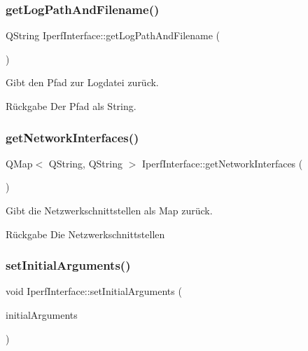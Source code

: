 \subsubsection{\texorpdfstring{get\+Log\+Path\+And\+Filename()}{getLogPathAndFilename()}}
{\footnotesize\ttfamily Q\+String Iperf\+Interface\+::get\+Log\+Path\+And\+Filename (\begin{DoxyParamCaption}{ }\end{DoxyParamCaption})}



Gibt den Pfad zur Logdatei zurück. 

\begin{DoxyReturn}{Rückgabe}
Der Pfad als String. 
\end{DoxyReturn}
\hypertarget{class_iperf_interface_a81faf533ca54a96e9fa33006d50830bd}{}\label{class_iperf_interface_a81faf533ca54a96e9fa33006d50830bd} 
\subsubsection{\texorpdfstring{get\+Network\+Interfaces()}{getNetworkInterfaces()}}
{\footnotesize\ttfamily Q\+Map$<$ Q\+String, Q\+String $>$ Iperf\+Interface\+::get\+Network\+Interfaces (\begin{DoxyParamCaption}{ }\end{DoxyParamCaption})}



Gibt die Netzwerkschnittstellen als Map zurück. 

\begin{DoxyReturn}{Rückgabe}
Die Netzwerkschnittstellen 
\end{DoxyReturn}
\hypertarget{class_iperf_interface_a4aa4821c81d91e93afe3f5ae2c24bacf}{}\label{class_iperf_interface_a4aa4821c81d91e93afe3f5ae2c24bacf} 
\subsubsection{\texorpdfstring{set\+Initial\+Arguments()}{setInitialArguments()}}
{\footnotesize\ttfamily void Iperf\+Interface\+::set\+Initial\+Arguments (\begin{DoxyParamCaption}\item[{Q\+String}]{initial\+Arguments }\end{DoxyParamCaption})}



